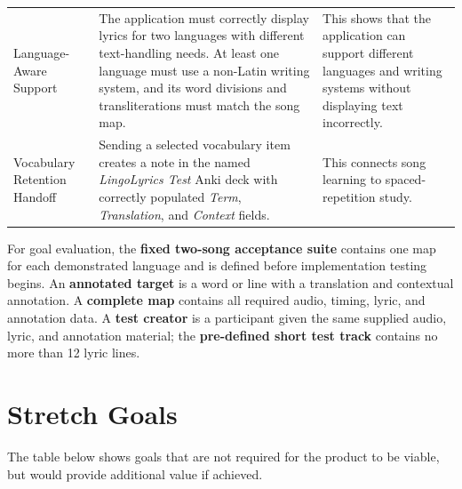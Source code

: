 \documentclass{article}
\begin{document}
\begin{longtable}{@{}>{\raggedright\arraybackslash}p{}
                       >{\raggedright\arraybackslash}p{}
                       >{\raggedright\arraybackslash}p{}@{}}
\addlinespace
Language-Aware Support & The application must correctly display lyrics for two languages with different text-handling needs. At least one language must use a non-Latin writing system, and its word divisions and transliterations must match the song map. & This shows that the application can support different languages and writing systems without displaying text incorrectly.\\
\addlinespace
Vocabulary Retention Handoff & Sending a selected vocabulary item creates a note in the named \emph{LingoLyrics Test} Anki deck with correctly populated \emph{Term}, \emph{Translation}, and \emph{Context} fields. & This connects song learning to spaced-repetition study.\\
\end{longtable}

For goal evaluation, the \textbf{fixed two-song acceptance suite} contains one
map for each demonstrated language and is defined before implementation testing
begins. An \textbf{annotated target} is a word or line with a translation and
contextual annotation. A \textbf{complete map} contains all required audio,
timing, lyric, and annotation data. A \textbf{test creator} is a participant
given the same supplied audio, lyric, and annotation material; the
\textbf{pre-defined short test track} contains no more than 12 lyric lines.

\newpage

\section{Stretch Goals}
The table below shows goals that are not required for the product to be viable,
but would provide additional value if achieved.
\end{document}
